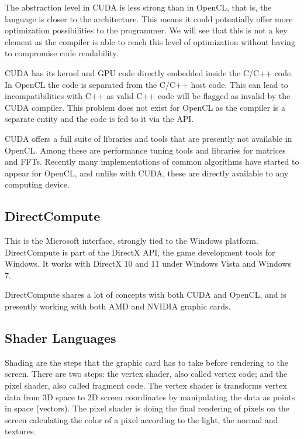 The abstraction level in \gls{CUDA} is less strong than in \gls{OpenCL}, that is, the language is closer to the architecture. This means it could potentially offer more optimization possibilities to the programmer. We will see that this is not a key element as the compiler is able to reach this level of optimization without having to compromise code readability.

\Gls{CUDA} has its kernel and \gls{GPU} code directly embedded inside the C/C++ code. In \gls{OpenCL} the code is separated from the C/C++ host code. This can lead to incompatibilities with C++ as valid C++ code will be flagged as invalid by the \gls{CUDA} compiler. This problem does not exist for \gls{OpenCL} as the compiler is a separate entity and the code is fed to it via the \gls{API}. 

\Gls{CUDA} offers a full suite of libraries and tools that are presently not available in \gls{OpenCL}. Among these are performance tuning tools and libraries for matrices and \glspl{FFT}. Recently many implementations of common algorithms have started to appear for \gls{OpenCL}, and unlike with \gls{CUDA}, these are directly available to any computing device.

\subsection{DirectCompute}

This is the Microsoft interface, strongly tied to the Windows platform. DirectCompute is part of the DirectX API, the game development tools for Windows. It works with DirectX 10 and 11 under Windows Vista and Windows 7. 

DirectCompute shares a lot of concepts with both \gls{CUDA} and \gls{OpenCL}, and is presently working with both AMD and NVIDIA graphic cards.

\subsection{Shader Languages}

Shading are the steps that the graphic card has to take before rendering to the screen. There are two steps: the vertex shader, also called vertex code; and the pixel shader, also called fragment code. The vertex shader is transforms vertex data from 3D space to 2D screen coordinates by manipulating the data as points in space (vectors). The pixel shader is doing the final rendering of pixels on the screen calculating the color of a pixel according to the light, the normal and textures. 

